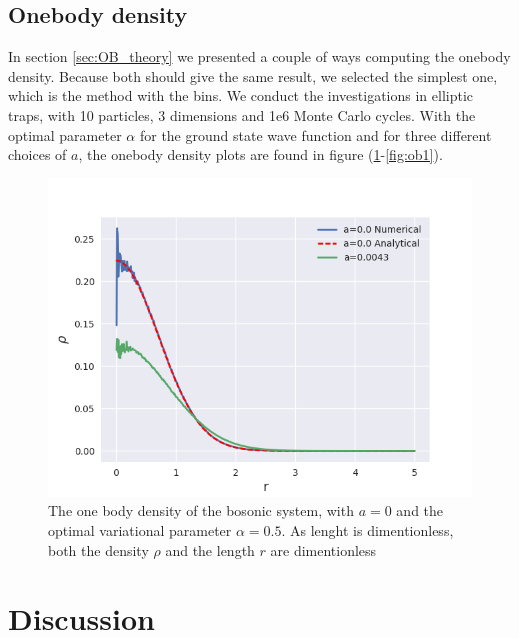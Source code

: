 \documentclass[norsk,a4paper,12pt]{article}
\begin{document}
\subsection{Onebody density}
In section \ref{sec:OB_theory} we presented a couple of ways computing the onebody density. Because both should give the same result, we selected the simplest one, which is the method with the bins. We conduct the investigations in elliptic traps, with 10 particles, 3 dimensions and 1e6 Monte Carlo cycles. With the optimal parameter $\alpha$ for the ground state wave function and for three different choices of $a$, the onebody density plots are found in figure (\ref{fig:ob0}-\ref{fig:ob1}).

\begin{figure} [H]
    \centering
    \includegraphics[scale=0.65]{images/ob.png}
    \caption{The one body density of the bosonic system, with $a=0$ and the optimal variational parameter $\alpha = 0.5$. As lenght is dimentionless, both the density $\rho$ and the length $r$ are dimentionless}
    \label{fig:ob0}
\end{figure}

\section{Discussion} \label{Discussion}
\end{document}
